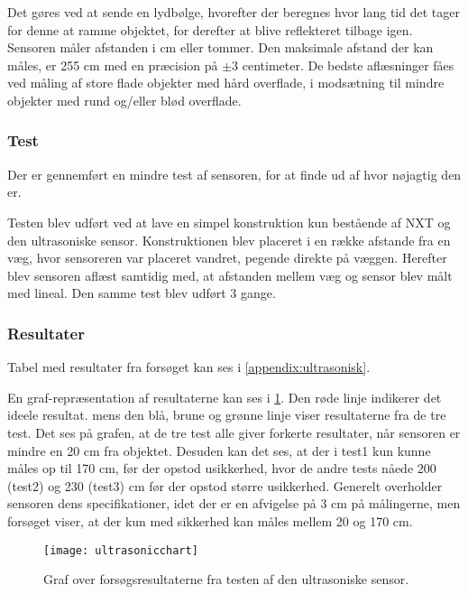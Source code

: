Det gøres ved at sende en lydbølge, hvorefter der beregnes hvor lang tid det tager for denne at ramme objektet, for derefter at blive reflekteret tilbage igen.
Sensoren måler afstanden i cm eller tommer.
Den maksimale afstand der kan måles, er 255 cm med en præcision på $\pm$3 centimeter.
De bedste aflæsninger fåes ved måling af store flade objekter med hård overflade, i modsætning til mindre objekter med rund og/eller blød overflade.\cite{nxt}

\subsubsection{Test}
Der er gennemført en mindre test af sensoren, for at finde ud af hvor nøjagtig den er.

Testen blev udført ved at lave en simpel konstruktion kun bestående af NXT og den ultrasoniske sensor.
Konstruktionen blev placeret i en række afstande fra en væg, hvor sensoreren var placeret vandret, pegende direkte på væggen.
Herefter blev sensoren aflæst samtidig med, at afstanden mellem væg og sensor blev målt med lineal.
Den samme test blev udført 3 gange.

\subsubsection{Resultater}\label{sensorer:us:resultater} Tabel med resultater fra forsøget kan ses i \cref{appendix:ultrasonisk}.

En graf-repræsentation af resultaterne kan ses i \cref{sensor:ultrasonic_resultat_diagram}.
Den røde linje indikerer det ideele resultat. mens den blå, brune og grønne linje viser resultaterne fra de tre test.
Det ses på grafen, at de tre test alle giver forkerte resultater, når sensoren er mindre en 20 cm fra objektet.
Desuden kan det ses, at der i test1 kun kunne måles op til 170 cm, før der opstod usikkerhed, hvor de andre tests nåede 200 (test2) og 230 (test3) cm før der opstod større usikkerhed.
Generelt overholder sensoren dens specifikationer, idet der er en afvigelse på 3 cm på målingerne, men forsøget viser, at der kun med sikkerhed kan måles mellem 20 og 170 cm.

\begin{figure}[h]
\centering
\texttt{[image: ultrasonicchart]}
\caption{Graf over forsøgsresultaterne fra testen af den ultrasoniske sensor.}
\label{sensor:ultrasonic_resultat_diagram}
\end{figure}



